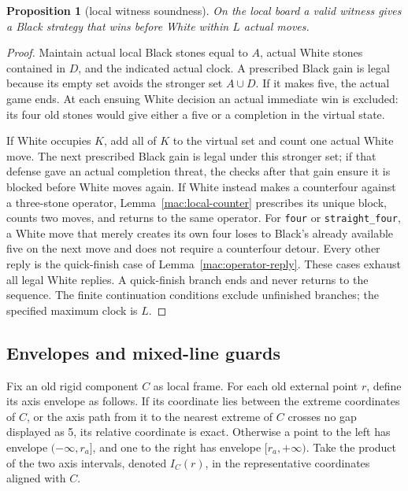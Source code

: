\documentclass[11pt]{article}
\newtheorem{proposition}[theorem]{Proposition}
\theoremstyle{definition}
\theoremstyle{remark}
\begin{document}
\begin{proposition}[local witness soundness]\label{mac:local-witness}
On the local board a valid witness gives a Black strategy that wins before White within \(L\) actual moves.

\end{proposition}
\begin{proof}
Maintain actual local Black stones equal to \(A\), actual White stones contained in \(D\), and the indicated actual clock. A prescribed Black gain is legal because its empty set avoids the stronger set \(A\cup D\). If it makes five, the actual game ends. At each ensuing White decision an actual immediate win is excluded: its four old stones would give either a five or a completion in the virtual state.

If White occupies \(K\), add all of \(K\) to the virtual set and count one actual White move. The next prescribed Black gain is legal under this stronger set; if that defense gave an actual completion threat, the checks after that gain ensure it is blocked before White moves again. If White instead makes a counterfour against a three-stone operator, Lemma~\ref{mac:local-counter} prescribes its unique block, counts two moves, and returns to the same operator. For \texttt{four} or \texttt{straight\_four}, a White move that merely creates its own four loses to Black's already available five on the next move and does not require a counterfour detour. Every other reply is the quick-finish case of Lemma~\ref{mac:operator-reply}. These cases exhaust all legal White replies. A quick-finish branch ends and never returns to the sequence. The finite continuation conditions exclude unfinished branches; the specified maximum clock is \(L\). 
\end{proof}

\subsection{Envelopes and mixed-line guards}\label{mac:envelope-section}

Fix an old rigid component \(C\) as local frame. For each old external point \(r\), define its axis envelope as follows. If its coordinate lies between the extreme coordinates of \(C\), or the axis path from it to the nearest extreme of \(C\) crosses no gap displayed as 5, its relative coordinate is exact. Otherwise a point to the left has envelope \(( -\infty,r_a]\), and one to the right has envelope \([r_a,+\infty)\). Take the product of the two axis intervals, denoted \(I_C(r)\), in the representative coordinates aligned with \(C\).
\end{document}
